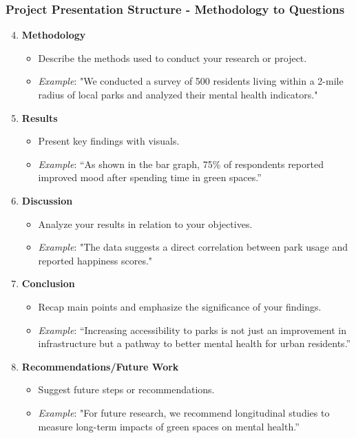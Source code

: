 \documentclass[aspectratio=169]{beamer}
\begin{document}
\begin{frame}[fragile]
    \frametitle{Project Presentation Structure - Methodology to Questions}
    \begin{enumerate}
        \setcounter{enumi}{3}
        \item \textbf{Methodology}
            \begin{itemize}
                \item Describe the methods used to conduct your research or project.
                \item \textit{Example}: "We conducted a survey of 500 residents living within a 2-mile radius of local parks and analyzed their mental health indicators."
            \end{itemize}

        \item \textbf{Results}
            \begin{itemize}
                \item Present key findings with visuals.
                \item \textit{Example}: “As shown in the bar graph, 75\% of respondents reported improved mood after spending time in green spaces.”
            \end{itemize}

        \item \textbf{Discussion}
            \begin{itemize}
                \item Analyze your results in relation to your objectives.
                \item \textit{Example}: "The data suggests a direct correlation between park usage and reported happiness scores."
            \end{itemize}

        \item \textbf{Conclusion}
            \begin{itemize}
                \item Recap main points and emphasize the significance of your findings.
                \item \textit{Example}: “Increasing accessibility to parks is not just an improvement in infrastructure but a pathway to better mental health for urban residents.”
            \end{itemize}

        \item \textbf{Recommendations/Future Work}
            \begin{itemize}
                \item Suggest future steps or recommendations.
                \item \textit{Example}: "For future research, we recommend longitudinal studies to measure long-term impacts of green spaces on mental health.”
            \end{itemize}
        

\end{enumerate}
\end{frame}
\end{document}
